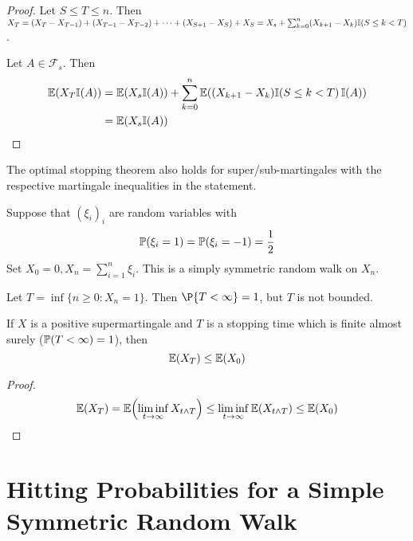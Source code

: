 \begin{proof}
  Let $S \leq T \leq n$.  Then $X_{T} = (X_{T} - X_{T-1}) + (X_{T-1} -
  X_{T-2}) + \dots + (X_{S+1} - X_{S}) + X_{S} = X_{s} +
  \sum_{k=0}^{n} (X_{k+1} - X_{k}) \I{S \leq k < T}$.

  Let $A \in \mathcal{F}_{s}$.  Then
  \begin{align}
    \label{eq:28}
    \E{X_{T}\I{A}} &= \E{X_{s}\I{A}} + \sum_{k=0}^{n} \E{(X_{k+1} -
      X_{k})\I{S \leq k < T} \I{A}} \\
    &= \E{X_{s} \I{A}}
  \end{align}
\end{proof}

\begin{remark}
  The optimal stopping theorem also holds for {super/sub}-martingales
  with the respective martingale inequalities in the statement.
\end{remark}

\begin{exmp}
  \label{defn:discrete_time_martingales:8}
  Suppose that $(\xi_{i})_{i}$ are random variables with
  \begin{equation}
    \label{eq:29}
    \Prob{\xi_{i} = 1} = \Prob{\xi_{i} = -1} = \frac{1}{2}
  \end{equation}  Set $X_{0} = 0, X_{n} = \sum_{i=1}^{n} \xi_{i}$.
  This is a simply symmetric random walk on $X_{n}$.

  Let $T = \inf \{ n \geq 0 : X_{n} = 1 \}$.  Then $\P{T < \infty} =
  1$, but $T$ is not bounded.
\end{exmp}

\begin{proposition}
  If $X$ is a positive supermartingale and $T$ is a stopping time
  which is finite almost surely ($\Prob{T < \infty} = 1$), then
  \begin{equation}
    \label{eq:30}
    \E{X_{T}} \leq \E{X_{0}}
  \end{equation}
\end{proposition}

\begin{proof}
  \begin{align}
    \label{eq:31}
    \E{X_{T}} = \E{\liminf_{t \rightarrow \infty} X_{t \wedge T}} \leq
    \liminf_{t \rightarrow \infty} \E{X_{t \wedge T}} \leq \E{X_{0}}
  \end{align}
\end{proof}

\section{Hitting Probabilities for a Simple Symmetric Random Walk}
\label{sec:hitt-prob-simple}

